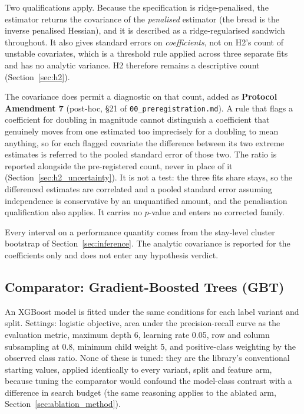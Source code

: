 Two qualifications apply. Because the specification is ridge-penalised, the
estimator returns the covariance of the \emph{penalised} estimator (the bread
is the inverse penalised Hessian), and it is described as a ridge-regularised
sandwich throughout. It also gives standard errors on \emph{coefficients}, not
on H2's count of unstable covariates, which is a threshold rule applied across
three separate fits and has no analytic variance. H2 therefore remains a
descriptive count (Section~\ref{sec:h2}).

The covariance does permit a diagnostic on that count, added as
\textbf{Protocol Amendment 7} (post-hoc, \S21 of
\texttt{00\_preregistration.md}). A rule that flags a coefficient for doubling
in magnitude cannot distinguish a coefficient that genuinely moves from one
estimated too imprecisely for a doubling to mean anything, so for each flagged
covariate the difference between its two extreme estimates is referred to the
pooled standard error of those two. The ratio is reported alongside the
pre-registered count, never in place of it
(Section~\ref{sec:h2_uncertainty}). It is not a test: the three fits share
stays, so the differenced estimates are correlated and a pooled standard error
assuming independence is conservative by an unquantified amount, and the
penalisation qualification also applies. It carries no $p$-value and enters no
corrected family.

Every interval on a performance quantity comes from the stay-level cluster
bootstrap of Section~\ref{sec:inference}. The analytic covariance is reported
for the coefficients only and does not enter any hypothesis verdict.

\subsection{Comparator: Gradient-Boosted Trees (GBT)}
\label{sec:gbt_spec}

An XGBoost model is fitted under the same conditions for each label variant and
split. Settings: logistic objective, area under the precision-recall curve as
the evaluation metric, maximum depth 6, learning rate 0.05, row and column
subsampling at 0.8, minimum child weight 5, and positive-class weighting by the
observed class ratio. None of these is tuned: they are the library's
conventional starting values, applied identically to every variant, split and
feature arm, because tuning the comparator would confound the model-class
contrast with a difference in search budget (the same reasoning applies to the
ablated arm, Section~\ref{sec:ablation_method}).

